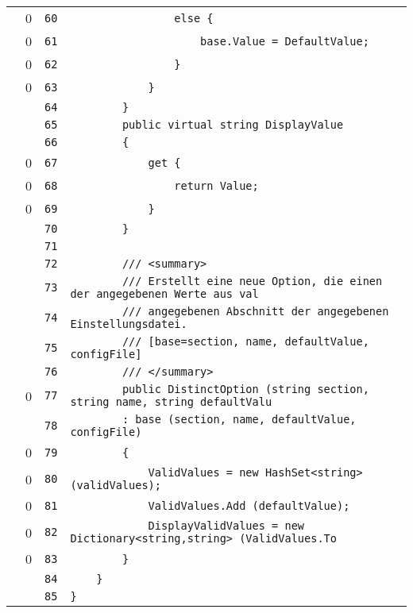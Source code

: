 \documentclass[a4paper,10pt]{article}
\begin{document}
\begin{longtable}[l]{lrrl}
\cellcolor{red} & 0 & \verb~60~ & \verb~                else {~\\
\cellcolor{red} & 0 & \verb~61~ & \verb~                    base.Value = DefaultValue;~\\
\cellcolor{red} & 0 & \verb~62~ & \verb~                }~\\
\cellcolor{red} & 0 & \verb~63~ & \verb~            }~\\
\cellcolor{gray} &  & \verb~64~ & \verb~        }~\\
\cellcolor{gray} &  & \verb~65~ & \verb~        public virtual string DisplayValue~\\
\cellcolor{gray} &  & \verb~66~ & \verb~        {~\\
\cellcolor{red} & 0 & \verb~67~ & \verb~            get {~\\
\cellcolor{red} & 0 & \verb~68~ & \verb~                return Value;~\\
\cellcolor{red} & 0 & \verb~69~ & \verb~            }~\\
\cellcolor{gray} &  & \verb~70~ & \verb~        }~\\
\cellcolor{gray} &  & \verb~71~ & \verb~~\\
\cellcolor{gray} &  & \verb~72~ & \verb~        /// <summary>~\\
\cellcolor{gray} &  & \verb~73~ & \verb~        /// Erstellt eine neue Option, die einen der angegebenen Werte aus val~\\
\cellcolor{gray} &  & \verb~74~ & \verb~        /// angegebenen Abschnitt der angegebenen Einstellungsdatei.~\\
\cellcolor{gray} &  & \verb~75~ & \verb~        /// [base=section, name, defaultValue, configFile]~\\
\cellcolor{gray} &  & \verb~76~ & \verb~        /// </summary>~\\
\cellcolor{red} & 0 & \verb~77~ & \verb~        public DistinctOption (string section, string name, string defaultValu~\\
\cellcolor{gray} &  & \verb~78~ & \verb~        : base (section, name, defaultValue, configFile)~\\
\cellcolor{red} & 0 & \verb~79~ & \verb~        {~\\
\cellcolor{red} & 0 & \verb~80~ & \verb~            ValidValues = new HashSet<string> (validValues);~\\
\cellcolor{red} & 0 & \verb~81~ & \verb~            ValidValues.Add (defaultValue);~\\
\cellcolor{red} & 0 & \verb~82~ & \verb~            DisplayValidValues = new Dictionary<string,string> (ValidValues.To~\\
\cellcolor{red} & 0 & \verb~83~ & \verb~        }~\\
\cellcolor{gray} &  & \verb~84~ & \verb~    }~\\
\cellcolor{gray} &  & \verb~85~ & \verb~}~\\
\end{longtable}
\newpage
\end{document}
